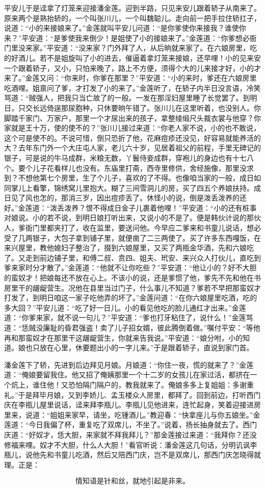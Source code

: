 平安儿于是迳拿了灯笼来迎接潘金莲。迎到半路，只见来安儿跟着轿子从南来了。原来两个是熟抬轿的，一个叫张川儿，一个叫魏聪儿。走向前一把手拉住轿扛子，说道：“小的来接娘来了。”金莲就叫平安儿问道：“是你爹使你来接我？谁使你来？”平安道：“是爹使我来倒少！是姐使了小的接娘来了。”金莲道：“你爹想必衙门里没来家。”平安道：“没来家？门外拜了人，从后晌就来家了。在六娘房里，吃的好酒儿。若不是姐旋叫了小的进去，催逼着拿灯笼来接娘，还早哩！小的见来安一个跟着轿子，又小，只怕来晚了，路上不方便，须得个大的儿来接才好，小的才来了。”金莲又问：“你来时，你爹在那里？”平安道：“小的来时，爹还在六娘房里吃酒哩。姐禀问了爹，才打发了小的来了。”金莲听了，在轿子内半日没言语，冷笑骂道：“贼强人，把我只当亡故了的一般。一发在那淫妇屋里睡了长觉罢了。到明日，只交长远倚逞那尿胞种，只休要晌午错了。张川儿在这里听着，也没别人。你脚踏千家门、万家户，那里一个才尿出来的孩子，拿整绫缎尺头裁衣裳与他穿？你家就是王十万，使的使不的？”张川儿接过来道：“你老人家不说，小的也不敢说，这个可是使不的。不说可惜，倒只恐折了他，花麻痘疹还没见，好容易就能养活的大？去年东门外一个大庄屯人家，老儿六十岁，见居着祖父的前程，手里无碑记的银子，可是说的牛马成群，米粮无数，丫鬟侍妾成群，穿袍儿的身边也有十七八个。要个儿子花看样儿也没有。东庙里打斋，西寺里修供，舍经施像，那里没求到？不想他第七个房里，生了个儿子，喜欢的了不得。也像咱当家的一般，成日如同掌儿上看擎，锦绣窝儿里抱大。糊了三间雪洞儿的房，买了四五个养娘扶持。成日见了风也怎的，那消三岁，因出痘疹丢了。休怪小的说，倒是泼丢泼养的还好。”金莲道：“泼丢泼养？恨不得成日金子儿裹着他哩！”平安道：“小的还有桩事对娘说。小的若不说，到明日娘打听出来，又说小的不是了。便是韩伙计说的那伙人，爹衙门里都夹打了，收在监里，要送问他。今早应二爹来和书童儿说话，想必受了几两银子，大包子拿到铺子里，就便凿了二三两使了。买了许多东西嘎饭，在来兴屋里，教他媳妇子整治了，掇到六娘屋里，又买了两瓶金华酒，先和六娘吃了。又走到前边铺子里，和傅二叔、贲四、姐夫、玳安、来兴众人打伙儿，直吃到爹来家时分才散了。”金莲道：“他就不让你吃些？”平安道：“他让小的？好不大胆的蛮奴才！把娘每还不放在心上。不该小的说，还是爹惯了他，爹先不先和他在书房里干的龌龊营生。况他在县里当过门子，什么事儿不知道？爹若不早把那蛮奴才打发了，到明日咱这一家子吃他弄的坏了。”金莲问道：“在你六娘屋里吃酒，吃的多大回？”平安儿道：“吃了好一日儿。小的看见他吃的脸儿通红才出来。”金莲道：“你爹来家，就不说一句儿？”平安道：“爹也打牙粘住了，说什么！”金莲骂道：“恁贼没廉耻的昏君强盗！卖了儿子招女婿，彼此腾倒着做。”嘱付平安：“等他再和那蛮奴才在那里干这龌龊营生，你就来告我说。”平安道：“娘分咐，小的知道。娘也只放在心里，休要题出小的一字儿来。”于是跟着轿子，直说到家门首。

潘金莲下了轿，先进到后边拜见月娘。月娘道：“你住一夜，慌的就来了？”金莲道：“俺娘要留我住。他又招了俺姨那里一个十二岁的女孩儿在家过活，都挤在一个炕上，谁住他！又恐怕隔门隔户的，教我就来了。俺娘多多上复姐姐：多谢重礼。”于是拜毕月娘，又到李娇儿、孟玉楼众人房里，都拜了。回到前边，打听西门庆在李瓶儿屋里说话，迳来拜李瓶儿。李瓶儿见他进来，连忙起身，笑着迎接进房里来，说道：“姐姐来家早，请坐，吃锺酒儿。”教迎春：“快拿座儿与你五娘坐。”金莲道：“今日我偏了杯，重复吃了双席儿，不坐了。”说着，扬长抽身就去了。西门庆道：“好奴才，恁大胆，来家就不拜我拜儿？”那金莲接过来道：“我拜你？还没修福来哩。奴才不大胆，什么人大胆！”看官听说：潘金莲这几句话，分明讥讽李瓶儿，说他先和书童儿吃酒，然后又陪西门庆，岂不是双席儿，那西门庆怎晓得就理。正是：

\[
情知语是针和丝，就地引起是非来。
\]
